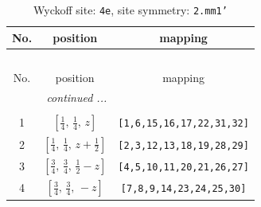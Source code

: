 \documentclass[fleqn,8pt]{jsarticle}
\begin{document}
\renewcommand{\arraystretch}{1.2}
\begin{longtable}{ccc}
\caption{Wyckoff site: {\tt 4e}, site symmetry: {\tt 2.mm1'}}
 \\
 \hline \hline
No. & position & mapping \\ \hline \endfirsthead

\multicolumn{2}{l}{\tablename\ \thetable{}} \\
 \hline \hline
No. & position & mapping \\ \hline \endhead

 \hline \hline
\multicolumn{2}{r}{\footnotesize\it continued ...} \\ \endfoot

 \hline \hline
\multicolumn{2}{r}{} \\ \endlastfoot

1 & $\left[ \frac{1}{4},\, \frac{1}{4},\, z \right]$ & {\tt [1,6,15,16,17,22,31,32]} \\ \hline
2 & $\left[ \frac{1}{4},\, \frac{1}{4},\, z + \frac{1}{2} \right]$ & {\tt [2,3,12,13,18,19,28,29]} \\ \hline
3 & $\left[ \frac{3}{4},\, \frac{3}{4},\, \frac{1}{2} - z \right]$ & {\tt [4,5,10,11,20,21,26,27]} \\ \hline
4 & $\left[ \frac{3}{4},\, \frac{3}{4},\, - z \right]$ & {\tt [7,8,9,14,23,24,25,30]} \\
\end{longtable}
\renewcommand{\arraystretch}{1.2}
\end{document}
